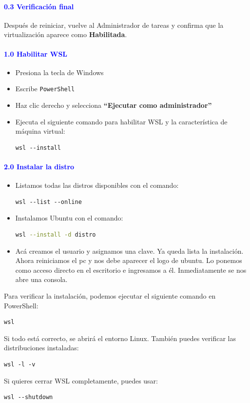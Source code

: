 \documentclass[12pt]{article}
\begin{document}
\paragraph{\textcolor{blue}{0.3 Verificación final}}
Después de reiniciar, vuelve al Administrador de tareas y 
confirma que la virtualización aparece como \textbf{Habilitada}.

\paragraph{\textcolor{blue}{1.0 Habilitar WSL}}
\begin{itemize}
    \item Presiona la tecla de Windows
    \item Escribe \texttt{PowerShell}
    \item Haz clic derecho y selecciona \textbf{``Ejecutar como administrador''}
    \item Ejecuta el siguiente comando para habilitar WSL y la característica de máquina virtual:
\begin{lstlisting}
wsl --install
\end{lstlisting}
\end{itemize}

\paragraph{\textcolor{blue}{2.0 Instalar la distro}}
\begin{itemize}
    \item Listamos todas las distros disponibles con el comando:
\begin{lstlisting}
wsl --list --online
\end{lstlisting}
    \item Instalamos Ubuntu con el comando:
\begin{lstlisting}[language=bash]
wsl --install -d distro 
\end{lstlisting}
    \item Acá creamos el usuario y asignamos una clave. Ya queda lista la instalación. 
    Ahora reiniciamos el pc y nos debe aparecer el logo de ubuntu. 
    Lo ponemos como acceso directo en el escritorio e ingresamos a él. 
    Inmediatamente se nos abre una consola.
\end{itemize}

Para verificar la instalación, podemos ejecutar el siguiente comando en PowerShell:
\begin{lstlisting}
wsl
\end{lstlisting}
Si todo está correcto, se abrirá el entorno Linux. También puedes verificar las distribuciones instaladas:
\begin{lstlisting}
wsl -l -v
\end{lstlisting}
Si quieres cerrar WSL completamente, puedes usar:
\begin{lstlisting}
wsl --shutdown
\end{lstlisting}
\end{document}
